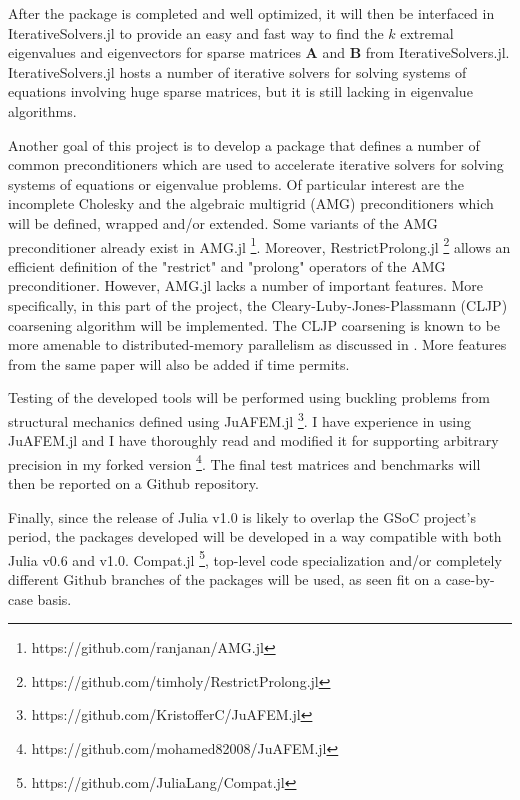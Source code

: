 \documentclass[12pt]{article}
\begin{document}
After the package is completed and well optimized, it will then be interfaced in IterativeSolvers.jl to provide an easy and fast way to find the $k$ extremal eigenvalues and eigenvectors for sparse matrices $\bm{A}$ and $\bm{B}$ from IterativeSolvers.jl. IterativeSolvers.jl hosts a number of iterative solvers for solving systems of equations involving huge sparse matrices, but it is still lacking in eigenvalue algorithms.

Another goal of this project is to develop a package that defines a number of common preconditioners which are used to accelerate iterative solvers for solving systems of equations or eigenvalue problems. Of particular interest are the incomplete Cholesky and the algebraic multigrid (AMG) preconditioners which will be defined, wrapped and/or extended. Some variants of the AMG preconditioner already exist in AMG.jl \footnote{https://github.com/ranjanan/AMG.jl}. Moreover, RestrictProlong.jl \footnote{https://github.com/timholy/RestrictProlong.jl} allows an efficient definition of the "restrict" and "prolong" operators of the AMG preconditioner. However, AMG.jl lacks a number of important features. More specifically, in this part of the project, the Cleary-Luby-Jones-Plassmann (CLJP) coarsening algorithm will be implemented. The CLJP coarsening is known to be more amenable to distributed-memory parallelism as discussed in \cite{Henson2002}. More features from the same paper will also be added if time permits.

Testing of the developed tools will be performed using buckling problems from structural mechanics defined using JuAFEM.jl \footnote{https://github.com/KristofferC/JuAFEM.jl}. I have experience in using JuAFEM.jl and I have thoroughly read and modified it for supporting arbitrary precision in my forked version \footnote{https://github.com/mohamed82008/JuAFEM.jl}. The final test matrices and benchmarks will then be reported on a Github repository.

Finally, since the release of Julia v1.0 is likely to overlap the GSoC project's period, the packages developed will be developed in a way compatible with both Julia v0.6 and v1.0. Compat.jl \footnote{https://github.com/JuliaLang/Compat.jl}, top-level code specialization and/or completely different Github branches of the packages will be used, as seen fit on a case-by-case basis.


\def\bibfont{\footnotesize}
\renewcommand{\bibsection}{\section{\bibname} \label{References}}


\end{document}
